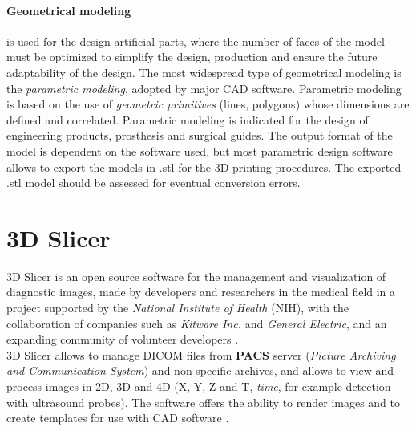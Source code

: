\paragraph{Geometrical modeling} is used for the design artificial parts, where the number of faces of the model must be optimized to simplify the design, production and ensure the future adaptability of the design. The most widespread type of geometrical modeling is the \emph{parametric modeling}, adopted by major CAD software. Parametric modeling is based on the use of \emph{geometric primitives} (lines, polygons) whose dimensions are defined and correlated. Parametric modeling is indicated for the design of engineering products, prosthesis and surgical guides. The output format of the model is dependent on the software used, but most parametric design software allows to export the models in .stl for the 3D printing procedures. The exported .stl model should be assessed for eventual conversion errors.

\section{3D Slicer}
3D Slicer is an open source software for the management and visualization of diagnostic images, made by developers and researchers in the medical field in a project supported by the \emph{National Institute of Health} (NIH), with the collaboration of companies such as \emph{Kitware Inc.} and \emph{General Electric}, and an expanding community of volunteer developers \parencite{Reference28}. \\
3D Slicer allows to manage DICOM files from \textbf{PACS} server (\emph{Picture Archiving and Communication System}) and non-specific archives, and allows to view and process images in 2D, 3D and 4D (X, Y, Z and T, \emph{time}, for example detection with ultrasound probes). The software offers the ability to render images and to create templates for use with CAD software \parencite{Reference31}.\\


